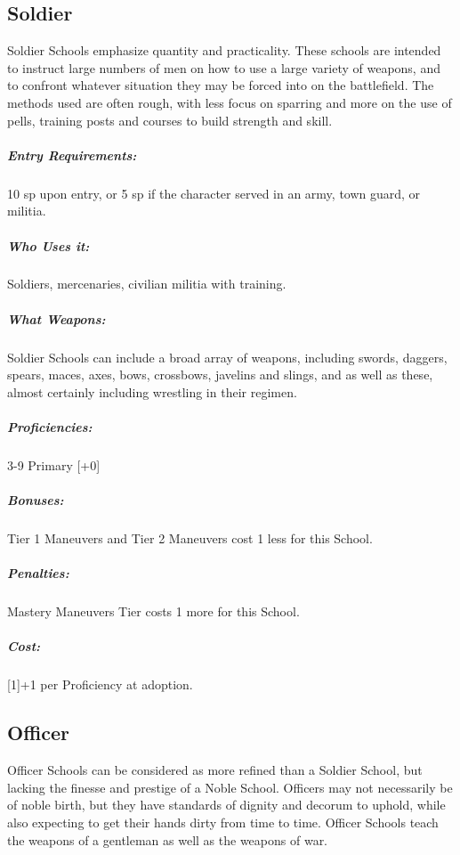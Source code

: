 \documentclass[oneside,11pt,english]{book}
\begin{document}
\subsection{Soldier}
Soldier Schools emphasize quantity and practicality. These schools are intended to instruct large numbers 
of men on how to use a large variety of weapons, and to confront whatever situation they may be forced 
into on the battlefield. The methods used are often rough, with less focus on sparring and more on the use 
of pells, training posts and courses to build strength and skill. 

\vspace{-15pt}\subparagraph{Entry Requirements:} 10 sp upon entry, or 5 sp if the character served in an army, town guard, or militia. 
\vspace{-15pt}\subparagraph{Who Uses it:} Soldiers, mercenaries, civilian militia with training.
\vspace{-15pt}\subparagraph{What Weapons:} Soldier Schools can include a broad array of weapons, including swords, daggers, spears, maces, axes, bows, crossbows, javelins and slings, and as well as these, almost certainly including wrestling in their regimen. 
\vspace{-15pt}\subparagraph{Proficiencies:} 3-9 Primary [+0]
\vspace{-15pt}\subparagraph{Bonuses:} Tier 1 Maneuvers and Tier 2 Maneuvers cost 1 less for this School. 
\vspace{-15pt}\subparagraph{Penalties:} Mastery Maneuvers Tier costs 1 more for this School. 
\vspace{-15pt}\subparagraph{Cost:}[1]+1 per Proficiency at adoption.

\subsection{Officer}
Officer Schools can be considered as more refined than a Soldier School, but lacking the finesse and 
prestige of a Noble School. Officers may not necessarily be of noble birth, but they have standards of 
dignity and decorum to uphold, while also expecting to get their hands dirty from time to time. Officer 
Schools teach the weapons of a gentleman as well as the weapons of war. 
\end{document}
